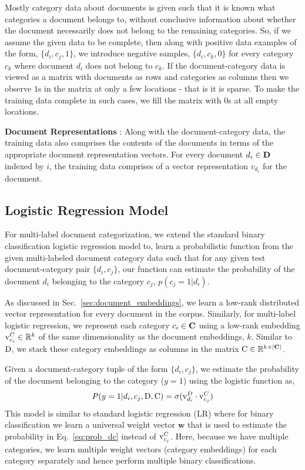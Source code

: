 Mostly category data about documents is given such that it is known what categories a document belongs to, without conclusive information about whether the document necessarily does not belong to the remaining categories. So, if we assume the given data to be complete, then along with positive data examples of the form, $\{ d_{i}, c_{j}, 1\}$, we introduce negative samples, $\{ d_{i}, c_{k}, 0\}$ for every category $c_{k}$ where document $d_{i}$ does not belong to $c_k$. 
If the document-category data is viewed as a matrix with documents as rows and categories as columns then we observe $1$s in the matrix at only a few locations - that is it is sparse. To make the training data complete in such cases, we fill the matrix with $0$s at all empty locations.

\textbf{Document Representations} : 
Along with the document-category data, the training data also comprises the contents of the documents in terms of the appropriate document representation vectors. For every document $d_{i} \in \mathbf{D}$ indexed by $i$, the training data comprises of a vector representation  $v_{d_{i}}$ for the document.

\subsection{Logistic Regression Model}
For multi-label document categorization, we extend the standard binary classification logistic regression model to, learn a probabilistic function from the given multi-labeled document category data such that for any given test document-category pair $\{d_{i}, c_{j}\}$, our function can estimate the probability of the document $d_{i}$ belonging to the category $c_{j}$, $p(c_{j}=1|d_{i})$.

As discussed in Sec.~\ref{sec:document_embeddings}, we learn a low-rank distributed vector representation for every document in the corpus. Similarly, for multi-label logistic regression, we represent each category $c_{i} \in \mathbf{C}$ using a low-rank embedding $\mathrm{v}^{C}_{c_{i}} \in \mathbb{R}^{k}$ of the same dimensionality as the document embeddings, $k$. Similar to $\mathrm{D}$, we stack these category embeddings as columns in the matrix $\mathrm{C} \in \mathbb{R}^{k \times |\mathbf{C}|}$.

Given a document-category tuple of the form $\{d_{i}, c_{j}\}$, we estimate the probability of the document belonging to the category ($y = 1$) using the logistic function as,
\begin{equation}
\label{eq:prob_dc}
P(y=1|d_{i}, c_{j}, \mathrm{D}, \mathrm{C}) = \sigma(\mathrm{v}^{D}_{d_{i}}\cdot \mathrm{v}^{C}_{c_{j}})
\end{equation}
This model is similar to standard logistic regression (LR) where for binary classification we learn a universal weight vector $\mathbf{w}$ that is used to estimate the probability in Eq.~\ref{eq:prob_dc} instead of $\mathrm{v}^{C}_{c_{j}}$. Here, because we have multiple categories, we learn multiple weight vectors (category embeddings) for each category separately and hence perform multiple binary classifications.

